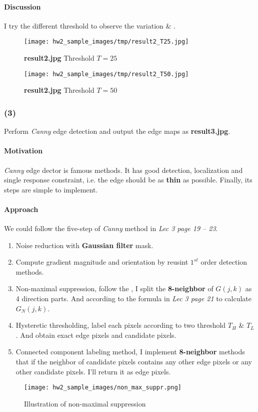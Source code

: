 \paragraph{Discussion}
I try the different threshold to observe the variation  \& .
\begin{figure}
    \centering
    \texttt{[image: hw2\_sample\_images/tmp/result2\_T25.jpg]}
    \caption{\textbf{result2.jpg} Threshold $T=25$}
    \label{result2_T25}
\end{figure}

\begin{figure}
    \centering
    \texttt{[image: hw2\_sample\_images/tmp/result2\_T50.jpg]}
    \caption{\textbf{result2.jpg} Threshold $T=50$}
    \label{result2_T50}
\end{figure}

\subsubsection{(3)}
Perform \textit{Canny} edge detection and output the edge maps as \textbf{result3.jpg}.

\paragraph{Motivation}
\textit{Canny} edge dector is famous methods. It has good detection, localization and single response constraint, i.e. the edge should be as \textbf{thin} as possible. Finally, its steps are simple to implement.

\paragraph{Approach}
We could follow the five-step of \textit{Canny} method in \textit{Lec 3 page 19 -- 23}.
\begin{enumerate}
    \item Noise reduction with \textbf{Gaussian filter} mask.
    \item Compute gradient magnitude and orientation by reusint $1^{st}$ order detection methods.
    \item Non-maximal suppression, follow the , I split the \textbf{8-neighbor} of $G(j, k)$ as \alert{4 direction parts}. And according to the formula in \textit{Lec 3 page 21} to calculate $G_{N}(j, k)$.
    \item Hysteretic thresholding, label each pixels according to two threshold $T_{H}$ \& $T_{L}$. And obtain \alert{exact edge pixels} and \alert{candidate pixels}.
    \item Connected component labeling method, I implement \textbf{8-neighbor} methods that if the neighbor of candidate pixels contains \alert{any other} edge pixels \alert{or any other} candidate pixels. I'll return it as edge pixels.
\end{enumerate}
\begin{figure}
    \centering
    \texttt{[image: hw2\_sample\_images/non\_max\_suppr.png]}
    \caption{Illustration of non-maximal suppression}
    \label{non_max_suppr}
\end{figure}

